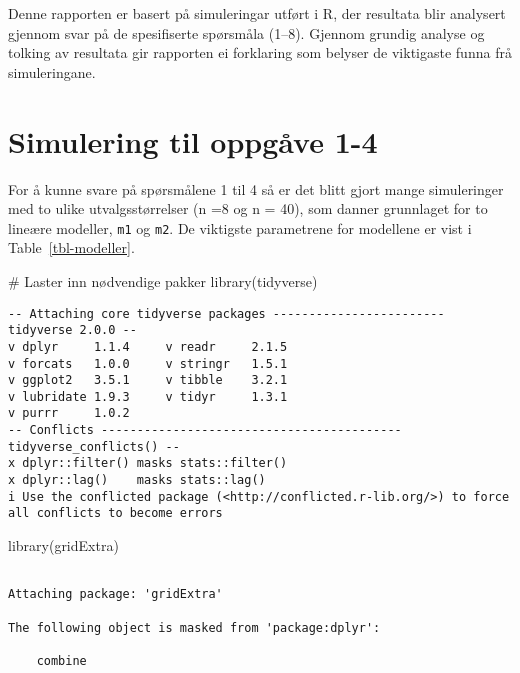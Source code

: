 \documentclass[
  letterpaper,
  DIV=11,
  numbers=noendperiod]{scrreprt}
\newenvironment{Shaded}{\begin{snugshade}}{\end{snugshade}}
\newcommand{\CommentTok}[1]{\textcolor[rgb]{0.37,0.37,0.37}{#1}}
\newcommand{\FunctionTok}[1]{\textcolor[rgb]{0.28,0.35,0.67}{#1}}
\newcommand{\NormalTok}[1]{\textcolor[rgb]{0.00,0.23,0.31}{#1}}
\begin{document}
Denne rapporten er basert på simuleringar utført i R, der resultata blir
analysert gjennom svar på de spesifiserte spørsmåla (1--8). Gjennom
grundig analyse og tolking av resultata gir rapporten ei forklaring som
belyser de viktigaste funna frå simuleringane.


\chapter{Simulering til oppgåve
1-4}\label{simulering-til-oppguxe5ve-1-4}

For å kunne svare på spørsmålene 1 til 4 så er det blitt gjort mange
simuleringer med to ulike utvalgsstørrelser (n =8 og n = 40), som danner
grunnlaget for to lineære modeller, \texttt{m1} og \texttt{m2}. De
viktigste parametrene for modellene er vist i Table~\ref{tbl-modeller}.

\begin{Shaded}
\begin{Highlighting}[]
\CommentTok{\# Laster inn nødvendige pakker}
\FunctionTok{library}\NormalTok{(tidyverse)}
\end{Highlighting}
\end{Shaded}

\begin{verbatim}
-- Attaching core tidyverse packages ------------------------ tidyverse 2.0.0 --
v dplyr     1.1.4     v readr     2.1.5
v forcats   1.0.0     v stringr   1.5.1
v ggplot2   3.5.1     v tibble    3.2.1
v lubridate 1.9.3     v tidyr     1.3.1
v purrr     1.0.2     
-- Conflicts ------------------------------------------ tidyverse_conflicts() --
x dplyr::filter() masks stats::filter()
x dplyr::lag()    masks stats::lag()
i Use the conflicted package (<http://conflicted.r-lib.org/>) to force all conflicts to become errors
\end{verbatim}

\begin{Shaded}
\begin{Highlighting}[]
\FunctionTok{library}\NormalTok{(gridExtra)}
\end{Highlighting}
\end{Shaded}

\begin{verbatim}

Attaching package: 'gridExtra'

The following object is masked from 'package:dplyr':

    combine
\end{verbatim}
\end{document}
